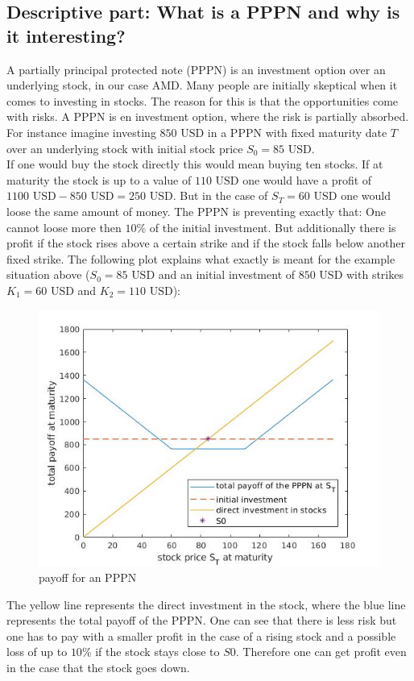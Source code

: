 \documentclass[11pt,oneside,a4paper]{article}
\begin{document}
	\subsection{Descriptive part: What is a PPPN and why is it interesting?}
	A partially principal protected note (PPPN) is an investment option over an underlying stock, in our case AMD. Many people are initially skeptical when it comes to investing in stocks. The reason for this is that the opportunities come with risks. A PPPN is en investment option, where the risk is partially absorbed. For instance imagine investing $850 \text{ USD}$ in a PPPN with fixed maturity date $ T $ over an underlying stock with initial stock price $ S_0 = 85 \text{ USD} $.\\
	 If one would buy the stock directly this would mean buying ten stocks. If at maturity the stock is up to a value of $ 110 \text{ USD} $ one would have a profit of $ 1100 \text{ USD} - 850 \text{ USD} = 250 \text{ USD}  $. But in the case of $ S_T = 60 \text{ USD} $ one would loose the same amount of money.
	 The PPPN is preventing exactly that: One cannot loose more then $ 10 \% $ of the initial investment. But additionally there is profit if the stock rises above a certain strike and if the stock falls below another fixed strike. The following plot explains what exactly is meant for the example situation above ($ S_0 = 85 \text{ USD}$ and an initial investment of $ 850 \text{ USD} $ with strikes $ K_1 = 60\text{ USD} $ and  $ K_2 = 110\text{ USD} $): 
	\begin{figure}[H]
		\centering
		\includegraphics[width=0.8\linewidth]{payoff_PPPN.jpg}
		 \caption{payoff for an PPPN}
	\end{figure} 
	The yellow line represents the direct investment in the stock, where the blue line represents the total payoff of the PPPN. One can see that there is less risk but one has to pay with a smaller profit in the case of a rising stock and a possible loss of up to $ 10 \% $ if the stock stays close to $ S0 $.  Therefore one can get profit even in the case that the stock goes down.
	\newpage
\end{document}
